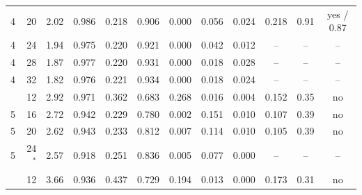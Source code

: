 \begin{table}[ht]
\begin{tabular}{rrcccccccccc}
4 & 20 & 2.02 & 0.986 & 0.218 & 0.906 & 0.000 & 0.056 & 0.024 & 0.218 & 0.91 & yes / 0.87 \\
4 & 24 & 1.94 & 0.975 & 0.220 & 0.921 & 0.000 & 0.042 & 0.012 & -- & -- & -- \\
4 & 28 & 1.87 & 0.977 & 0.220 & 0.931 & 0.000 & 0.018 & 0.028 & -- & -- & -- \\
4 & 32 & 1.82 & 0.976 & 0.221 & 0.934 & 0.000 & 0.018 & 0.024 & -- & -- & -- \\
\addlinespace[2pt]
5 & 12 & 2.92 & 0.971 & 0.362 & 0.683 & 0.268 & 0.016 & 0.004 & 0.152 & 0.35 & no \\
5 & 16 & 2.72 & 0.942 & 0.229 & 0.780 & 0.002 & 0.151 & 0.010 & 0.107 & 0.39 & no \\
5 & 20 & 2.62 & 0.943 & 0.233 & 0.812 & 0.007 & 0.114 & 0.010 & 0.105 & 0.39 & no \\
5 & 24$^\ast$ & 2.57 & 0.918 & 0.251 & 0.836 & 0.005 & 0.077 & 0.000 & -- & -- & -- \\
\addlinespace[2pt]
6 & 12 & 3.66 & 0.936 & 0.437 & 0.729 & 0.194 & 0.013 & 0.000 & 0.173 & 0.31 & no \\
\bottomrule
\end{tabular}
\end{table}
